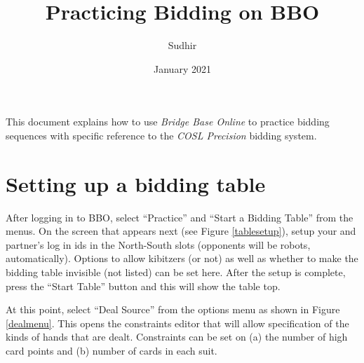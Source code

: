 \documentclass[a4paper,article,oneside]{memoir}
\begin{document}
\title{Practicing Bidding on BBO}
\author{Sudhir}
\date{January 2021}
\maketitle

This document explains how to use \emph{Bridge Base Online} to
practice bidding sequences with specific reference to the \emph{COSL
  Precision} bidding system.

\section{Setting up a bidding table}

After logging in to BBO, select ``Practice'' and ``Start a Bidding Table''
from the menus. On the screen that appears next (see Figure
\ref{tablesetup}), setup your and partner's log in ids in the
North-South slots (opponents will be robots, automatically). Options
to allow kibitzers (or not) as well as whether to make the bidding
table invisible (not listed) can be set here. After the setup is
complete, press the ``Start Table'' button and this will show the table
top.

At this point, select ``Deal Source'' from the options menu as shown in
Figure \ref{dealmenu}. This opens the constraints editor that will
allow specification of the kinds of hands that are dealt. Constraints
can be set on (a) the number of high card points and (b) number of
cards in each suit.
\end{document}
